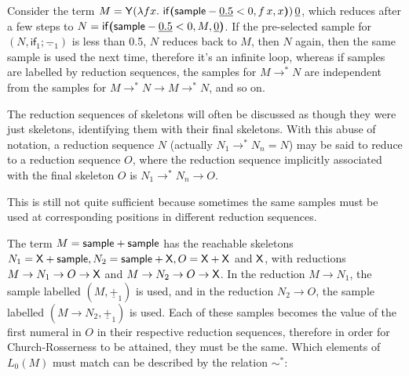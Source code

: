 \begin{example} Consider the term $M = \tY (\lambda f x.\ \tif{\tsample - \underline{0.5} < 0}{f \, x}{x}) \, \underline 0$, which reduces after a few steps to $N = \mathsf{if}\boldsymbol{(}\mathsf{sample} - \underline{0.5}  < 0, M, \underline 0\boldsymbol{)}$. If the pre-selected sample for $(N,\textsf{if}_1;\underline{-}_1)$ is less than 0.5, $N$ reduces back to $M$, then $N$ again, then the same sample is used the next time, therefore it's an infinite loop, whereas if samples are labelled by reduction sequences, the samples for $M \to^\ast N$ are independent from the samples for $M \to^\ast N \to M \to^\ast N$, and so on.
\end{example}

The reduction sequences of skeletons will often be discussed as though they were just skeletons, identifying them with their final skeletons. With this abuse of notation, a reduction sequence $N$ (actually $N_1 \to^\ast N_n = N$) may be said to reduce to a reduction sequence $O$, where the reduction sequence implicitly associated with the final skeleton $O$ is $N_1 \to^\ast N_n \to O$.

\medskip
This is still not quite sufficient because sometimes the same samples must be used at corresponding positions in different reduction sequences. 

\begin{example} \label{ex:cousin sim} 
The term $M = \mathsf{sample} + \mathsf{sample}$ has the reachable skeletons $N_1 = \mathsf{X} + \mathsf{sample}, N_2 = \mathsf{sample} + \mathsf{X}, O = \mathsf{X} + \mathsf{X}$ and $\mathsf{X}$, with reductions $M \to N_1 \to O \to \mathsf{X}$ and $M \to N_2 \to O \to \mathsf{X}$. 
In the reduction $M \to N_1$, the sample labelled $(M, \underline{+}_1)$ is used, and in the reduction $N_2 \to O$, the sample labelled $(M \to N_2, \underline{+}_1)$ is used. 
Each of these samples becomes the value of the first numeral in $O$ in their respective reduction sequences, therefore in order for Church-Rosserness to be attained, they must be the same. Which elements of $L_0(M)$ must match can be described by the relation $\sim^*$:
\end{example}

